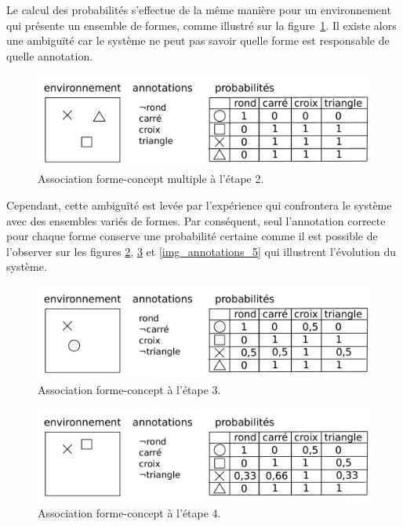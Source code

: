 Le calcul des probabilités s'effectue de la même manière pour un environnement qui présente un ensemble de formes, comme illustré sur la figure~\ref{img_annotations_2}. Il existe alors une ambiguïté car le système ne peut pas savoir quelle forme est responsable de quelle annotation.  

\begin{figure}[H] 
\includegraphics[width=\textwidth]{files/raisonneur/annotations_2} 
\caption{Association forme-concept multiple à l'étape 2.} 
\label{img_annotations_2}
\end{figure}

Cependant, cette ambiguïté est levée par l'expérience qui confrontera le système avec des ensembles variés de formes. Par conséquent, seul l'annotation correcte pour chaque forme conserve une probabilité certaine comme il est possible de l'observer sur les figures \ref{img_annotations_3}, \ref{img_annotations_4} et \ref{img_annotations_5} qui illustrent l'évolution du système. 

\begin{figure}[H] 
\includegraphics[width=\textwidth]{files/raisonneur/annotations_3} 
\caption{Association forme-concept à l'étape 3.} 
\label{img_annotations_3}
\end{figure}

\begin{figure}[H] 
\includegraphics[width=\textwidth]{files/raisonneur/annotations_4} 
\caption{Association forme-concept à l'étape 4.} 
\label{img_annotations_4}
\end{figure}

